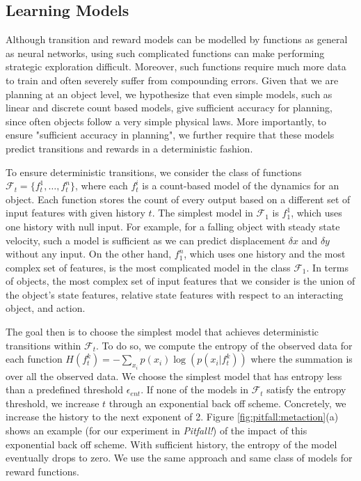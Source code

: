 \subsection{Learning Models}
Although transition and reward models can be modelled by functions as general as neural networks, using such complicated functions can make performing strategic exploration difficult. Moreover, such functions require much more data to train and often severely suffer from compounding errors. Given that we are planning at an object level, we hypothesize that even simple models, such as linear and discrete count based models, give sufficient accuracy for planning, since often objects follow a very simple physical laws. More importantly, to ensure "sufficient accuracy in planning", we further require that these models predict transitions and rewards in a deterministic fashion. 

To ensure deterministic transitions, we consider the class of functions $\mathcal{F}_t = \{f_{t}^{1},\dots,f_{t}^{n}\}$, where each $f_{t}^{i}$ is a count-based model of the dynamics for an object. Each function stores the count of every output based on a different set of input features with given history $t$. The simplest model in $\mathcal{F}_1$ is $f_{1}^{1}$, which uses one history with null input. For example, for a falling object with steady state velocity, such a model is sufficient as we can predict displacement $\delta x$ and $\delta y$ without any input. On the other hand, $f_{1}^{n}$, which uses one history and the most complex set of features, is the most complicated model in the class $\mathcal{F}_1$. In terms of objects, the most complex set of input features that we consider is the union of the object's state features, relative state features with respect to an interacting object, and action. 

The goal then is to choose the simplest model that achieves deterministic transitions within $\mathcal{F}_t$. To do so, we compute the entropy of the observed data for each function $H(f_{t}^{k}) = -\sum_{x_i} p(x_i) \log(p(x_i|f_{t}^{k}))$ where the summation is over all the observed data. We choose the simplest model that has entropy less than a predefined threshold $\epsilon_{ent}$. If none of the models in $\mathcal{F}_t$ satisfy the entropy threshold, we increase $t$ through an exponential back off scheme. Concretely, we increase the history to the next exponent of 2. Figure \ref{fig:pitfall:metaction}(a) shows an example (for our experiment in \textit{Pitfall!}) of the impact of this exponential back off scheme. With sufficient history, the entropy of the model eventually drops to zero. We use the same approach and same class of models for reward functions.

